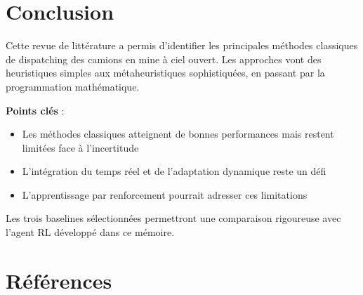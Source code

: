 \documentclass[12pt,a4paper]{article}
\begin{document}
\section{Conclusion}

Cette revue de litt\'erature a permis d'identifier les principales m\'ethodes classiques de dispatching des camions en mine \`a ciel ouvert. Les approches vont des heuristiques simples aux m\'etaheuristiques sophistiqu\'ees, en passant par la programmation math\'ematique.

\textbf{Points cl\'es} :
\begin{itemize}
    \item Les m\'ethodes classiques atteignent de bonnes performances mais restent limit\'ees face \`a l'incertitude
    \item L'int\'egration du temps r\'eel et de l'adaptation dynamique reste un d\'efi
    \item L'apprentissage par renforcement pourrait adresser ces limitations
\end{itemize}

Les trois baselines s\'electionn\'ees permettront une comparaison rigoureuse avec l'agent RL d\'evelopp\'e dans ce m\'emoire.

\section*{R\'ef\'erences}
\end{document}
